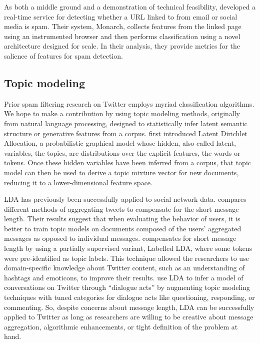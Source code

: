 \documentclass[times, 11pt, twocolumn]{article}
\begin{document}
As both a middle ground and a demonstration of technical feasibility, \cite{Thomas2011} 
developed a real-time service for detecting whether a URL linked to from email or 
social media is spam. Their system, Monarch, collects features from the linked page 
using an instrumented browser and then performs classification using a novel architecture 
designed for scale. In their analysis, they provide metrics for the salience of 
features for spam detection.

\subsection{Topic modeling}
Prior spam filtering research on Twitter employs myriad classification algorithms. We hope 
to make a contribution by using topic modeling methods, originally from natural language 
processing, designed to statistically infer latent semantic structure or generative features 
from a corpus. \cite{Blei2003} first introduced Latent Dirichlet Allocation, a probabilistic 
graphical model whose hidden, also called latent, variables, the topics, are distributions 
over the explicit features, the words or tokens. Once these hidden variables have been 
inferred from a corpus, that topic model can then be used to derive a topic mixture vector 
for new documents, reducing it to a lower-dimensional feature space.

LDA has previously been successfully applied to social network data. \cite{Hong2010} 
compares different methods of aggregating tweets to compensate for the short message 
length. Their results suggest that when evaluating the behavior of users, it is better to 
train topic models on documents composed of the users' aggregated messages as opposed to 
individual messages. \cite{Ramage2010} compensates for short message length by using a 
partially supervised variant, Labelled LDA, where some tokens were pre-identified as 
topic labels. This technique allowed the researchers to use domain-specific knowledge 
about Twitter content, such as an understanding of hashtags and emoticons, to improve 
their results. \cite{Ritter2010} use LDA to infer a model of conversations on Twitter 
through ``dialogue acts'' by augmenting topic modeling techniques with tuned categories 
for dialogue acts like questioning, responding, or commenting. So, despite concerns 
about message length, LDA can be successfully applied to Twitter as long as 
researchers are willing to be creative about message aggregation, algorithmic enhancements,
or tight definition of the problem at hand.
\end{document}
